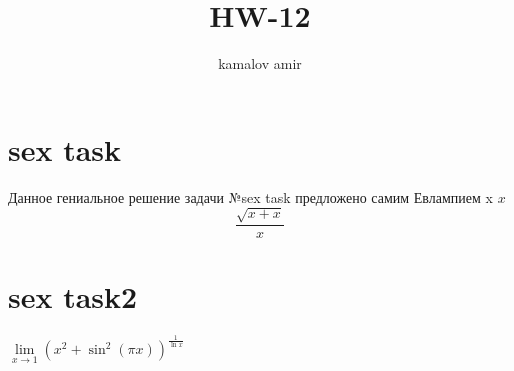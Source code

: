 \documentclass[12pt]{article}
\title{HW-12}
\date{}
\author{kamalov amir}
\begin{document}
 
  \maketitle
  \section*{}

  \section{sex task}
  Данное гениальное решение задачи №sex task предложено самим Евлампием
  x
  $x$
  $$\frac{\sqrt{x+x}}{x}$$
  \section{sex task2}
  $\lim\limits_{x\to1}(x^2 + \sin^2(\pi x))^{\frac{1}{\ln x}}$
\end{document}
